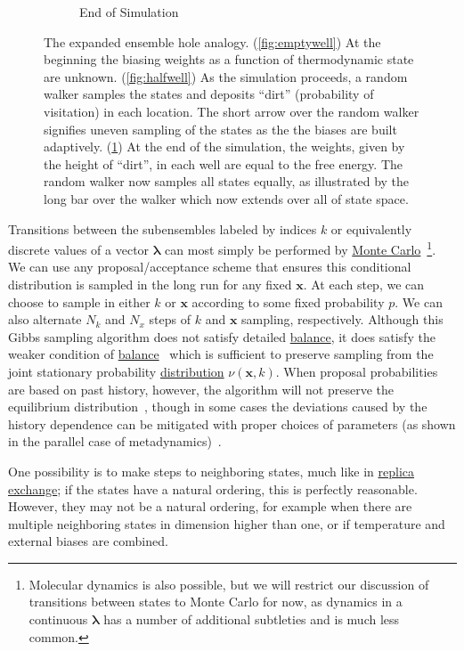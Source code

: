 \documentclass[9pt,review]{livecoms}
\newcommand{\vx}{\mathbf{x}}
\begin{document}
\begin{figure}[ht]
\begin{subfigure}[b]{0.33\textwidth}
\caption{End of Simulation}
\label{fig:fullwell}
\end{subfigure}
\caption{The expanded ensemble hole analogy. (\ref{fig:emptywell}) At the beginning the biasing weights as a function of thermodynamic state are unknown. (\ref{fig:halfwell}) As the simulation proceeds, a random walker samples the states and deposits ``dirt'' (probability of visitation) in each location.  The short arrow over the random walker signifies uneven sampling of the states as the the biases are built adaptively.  (\ref{fig:fullwell}) At the end of the simulation, the weights, given by the height of ``dirt'', in each well are equal to the free energy.  The random walker now samples all states equally, as illustrated by the long bar over the walker which now extends over all of state space.} \label{fig:EXEanalogy}
\end{figure}


Transitions between the subensembles labeled by indices $k$ or equivalently discrete values of a vector $\mathbf{\lambda}$ can most simply be performed by \hyperlink{ref:MetropolisMonteCarlo} {Monte Carlo}~\footnote{Molecular dynamics is also possible, but we will restrict our discussion of transitions
between states to Monte Carlo for now, as dynamics in a continuous $\mathbf{\lambda}$ has a number of additional subtleties and is much less common.}.  We can use any proposal/acceptance scheme that ensures this conditional distribution is sampled in the long run for any fixed $\vx$. At each step, we can choose to sample in either $k$ or $\vx$ according to some fixed probability $p$.  We can also alternate $N_k$ and $N_x$ steps of $k$ and $\vx$ sampling, respectively.  Although this Gibbs sampling algorithm does not satisfy detailed \hyperlink{ref:Balance} {balance}, it does satisfy the weaker condition of \hyperlink{ref:Balance} {balance}~\cite{deem:jcp:1999:balance} which is sufficient to preserve sampling from the joint stationary probability \hyperlink{ref:Distribution} {distribution}  $\nu(\vx,k)$.  When proposal probabilities are based on past history, however, the algorithm will not preserve the equilibrium distribution~\cite{reinhardt:cpl:2000:step-size-adjustment}, though in some cases the deviations caused by the history dependence can be mitigated with proper choices of parameters (as shown in the parallel case of metadynamics)~\cite{bussi.equilibriummetadynamics}.

One possibility is to make steps to neighboring states, much like in \hyperlink{ref:ReplEx} {replica exchange}; if the states have a natural ordering, this is perfectly reasonable. However, they may not be a natural ordering, for example when there are multiple neighboring states in dimension higher than one, or if temperature and external biases are combined.
\end{document}
